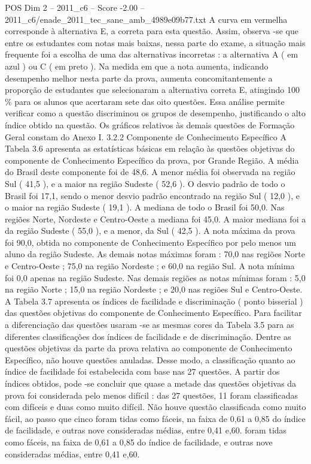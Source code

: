 \begin{textsample}{POS Dim 2 – 2011\_c6 – Score -2.00 – 2011\_c6/enade\_2011\_tec\_sane\_amb\_4989e09b77.txt}
A curva em vermelha corresponde à alternativa E, a correta para esta questão.
Assim, observa -se que entre os estudantes com notas mais baixas, nessa parte do exame, a situação mais frequente foi a escolha de uma das alternativas incorretas : a alternativa A ( em azul ) ou C ( em preto ).
Na medida em que a nota aumenta, indicando desempenho melhor nesta parte da prova, aumenta concomitantemente a proporção de estudantes que selecionaram a alternativa correta E, atingindo 100 \% para os alunos que acertaram sete das oito questões.
Essa análise permite verificar como a questão discriminou os grupos de desempenho, justificando o alto índice obtido na questão.
Os gráficos relativos às demais questões de Formação Geral constam do Anexo I. 3.2.2 Componente de Conhecimento Específico A Tabela 3.6 apresenta as estatísticas básicas em relação às questões objetivas do componente de Conhecimento Específico da prova, por Grande Região.
A média do Brasil deste componente foi de 48,6.
A menor média foi observada na região Sul ( 41,5 ), e a maior na região Sudeste ( 52,6 ).
O desvio padrão de todo o Brasil foi 17,1, sendo o menor desvio padrão encontrado na região Sul ( 12,0 ), e o maior na região Sudeste ( 19,1 ).
A mediana de todo o Brasil foi 50,0.
Nas regiões Norte, Nordeste e Centro-Oeste a mediana foi 45,0.
A maior mediana foi a da região Sudeste ( 55,0 ), e a menor, da Sul ( 42,5 ).
A nota máxima da prova foi 90,0, obtida no componente de Conhecimento Específico por pelo menos um aluno da região Sudeste.
As demais notas máximas foram : 70,0 nas regiões Norte e Centro-Oeste ; 75,0 na região Nordeste ; e 60,0 na região Sul.
A nota mínima foi 0,0 apenas na região Sudeste.
Nas demais regiões as notas mínimas foram : 5,0 na região Norte ; 15,0 na região Nordeste ; e 20,0 nas regiões Sul e Centro-Oeste.
A Tabela 3.7 apresenta os índices de facilidade e discriminação ( ponto bisserial ) das questões objetivas do componente de Conhecimento Específico.
Para facilitar a diferenciação das questões usaram -se as mesmas cores da Tabela 3.5 para as diferentes classificações dos índices de facilidade e de discriminação.
Dentre as questões objetivas da parte da prova relativa ao componente de Conhecimento Específico, não houve questões anuladas.
Desse modo, a classificação quanto ao índice de facilidade foi estabelecida com base nas 27 questões.
A partir dos índices obtidos, pode -se concluir que quase a metade das questões objetivas da prova foi considerada pelo menos difícil : das 27 questões, 11 foram classificadas com difíceis e duas como muito difícil.
Não houve questão classificada como muito fácil, ao passo que cinco foram tidas como fáceis, na faixa de 0,61 a 0,85 do índice de facilidade, e outras nove consideradas médias, entre 0,41 e,60. foram tidas como fáceis, na faixa de 0,61 a 0,85 do índice de facilidade, e outras nove consideradas médias, entre 0,41 e,60.

\end{textsample}
